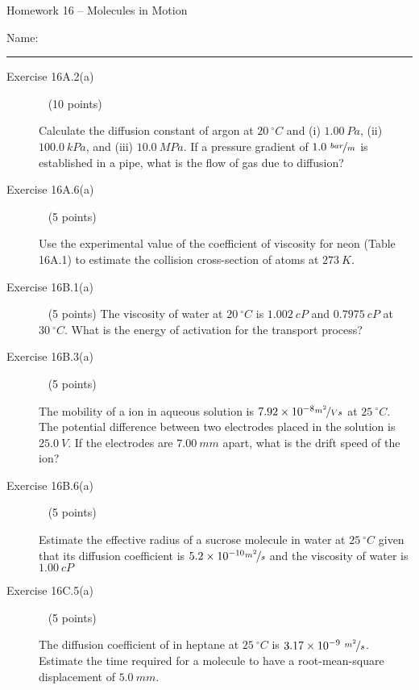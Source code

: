 \documentclass[12pt, openany, letterpaper]{memoir}
\begin{document}
\begin{center}
	{\large Homework 16 -- Molecules in Motion}
	
\end{center}

Name: \rule[-.1mm]{15em}{0.1pt}

\begin{description}	
	\item [Exercise 16A.2(a)] ~ (10 points)
	
	Calculate the diffusion constant of argon at $20~^\circ C$ and (i) $1.00~Pa$, (ii) $100.0~kPa$, and (iii) $10.0~MPa$. If a pressure gradient of $1.0~\nicefrac{bar}{m}$ is established in a pipe, what is the flow of gas due to diffusion?
	
	
	\vspace{19em}
	\item [Exercise 16A.6(a)] ~ (5 points)
	
	Use the experimental value of the coefficient of viscosity for neon (Table 16A.1) to estimate the collision cross-section of  atoms at $273~K$.
	
	\vspace{20em}
	\item [Exercise 16B.1(a)] ~ (5 points)
	The viscosity of water at $20~^\circ C$ is $1.002~cP$ and $0.7975~cP$ at $30~^\circ C$. What is the energy of activation for the transport process?
	
	\vspace{23em}
	\item [Exercise 16B.3(a)] ~ (5 points)
	
	The mobility of a  ion in aqueous solution is $7.92\times10^{-8}\nicefrac{m^2}{Vs}$ at $25~^\circ C$. The potential difference between two electrodes placed in the solution is $25.0~V$. If the electrodes are $7.00~mm$ apart, what is the drift speed of the  ion?
	
	\vspace{23em}	
	\item [Exercise 16B.6(a)] ~ (5 points)
	
	Estimate the effective radius of a sucrose molecule in water at $25~^\circ C$ given that its diffusion coefficient is $5.2\times10^{-10}\nicefrac{m^2}{s}$ and the viscosity of water is $1.00~cP$
	
	\vspace{23em}	
	\item [Exercise 16C.5(a)] ~ (5 points)	
	
	The diffusion coefficient of  in heptane at $25~^\circ C$ is $3.17\times10^{-9}~\nicefrac{m^2}{s}$. Estimate the time required for a  molecule to have a root-mean-square displacement of $5.0~mm$.	
	

\end{description}
\end{document}
